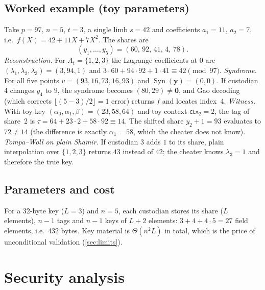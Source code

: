 \documentclass[11pt,a4paper]{article}
\theoremstyle{plain}
\theoremstyle{definition}
\newcommand{\ctx}{\mathsf{ctx}}
\DeclareMathOperator{\Syn}{Syn}
\begin{document}
\subsection{Worked example (toy parameters)}\label{sec:toy}
Take $p=97$, $n=5$, $t=3$, a single limb $s=42$ and coefficients $a_1=11$, $a_2=7$, i.e.\
$f(X)=42+11X+7X^2$. The shares are
\[
  (y_1,\dots,y_5)=(60,\,92,\,41,\,4,\,78).
\]
\emph{Reconstruction.} For $A_t=\{1,2,3\}$ the Lagrange coefficients at $0$ are
$(\lambda_1,\lambda_2,\lambda_3)=(3,94,1)$ and $3\cdot60+94\cdot92+1\cdot41\equiv42\pmod{97}$.
\emph{Syndrome.} For all five points $v=(93,16,73,16,93)$ and $\Syn(\mathbf y)=(0,0)$. If custodian 4
changes $y_4$ to $9$, the syndrome becomes $(80,29)\neq\mathbf 0$, and Gao decoding (which corrects
$\lfloor(5-3)/2\rfloor=1$ error) returns $f$ and locates index~4.
\emph{Witness.} With toy key $(\alpha_0,\alpha_1,\beta)=(23,58,64)$ and toy context $\ctx_2=2$, the tag of
share~2 is $\tau=64+23\cdot2+58\cdot92\equiv14$. The shifted share $y_2+1=93$ evaluates to $72\ne14$
(the difference is exactly $\alpha_1=58$, which the cheater does not know).
\emph{Tompa--Woll on plain Shamir.} If custodian 3 adds $1$ to its share, plain interpolation over
$\{1,2,3\}$ returns $43$ instead of $42$; the cheater knows $\lambda_3=1$ and therefore the true key.

\subsection{Parameters and cost}
For a 32-byte key ($L=3$) and $n=5$, each custodian stores its share ($L$ elements), $n-1$ tags and
$n-1$ keys of $L+2$ elements: $3+4+4\cdot5=27$ field elements, i.e.\ 432 bytes. Key material is
$\Theta(n^2L)$ in total, which is the price of unconditional validation (\cref{sec:limits}).

\section{Security analysis}\label{sec:security}
\end{document}
